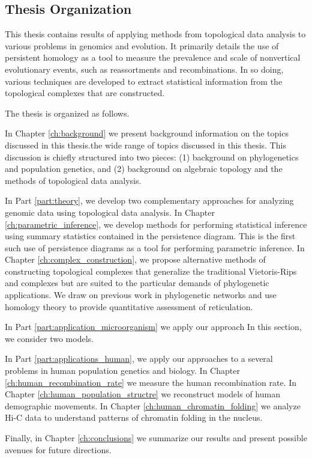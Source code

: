 \subsection{Thesis Organization}

This thesis contains results of applying methods from topological data analysis to various problems in genomics and evolution.
It primarily details the use of persistent homology as a tool to measure the prevalence and scale of nonvertical evolutionary events, such as reassortments and recombinations.
In so doing, various techniques are developed to extract statistical information from the topological complexes that are constructed.

The thesis is organized as follows.

In Chapter \ref{ch:background} we present background information on the topics discussed in this thesis.the wide range of topics discussed in this thesis.
This discussion is chiefly structured into two pieces: (1) background on phylogenetics and population genetics, and (2) background on algebraic topology and the methods of topological data analysis.

In Part \ref{part:theory}, we develop two complementary approaches for analyzing genomic data using topological data analysis.
In Chapter \ref{ch:parametric_inference}, we develop methods for performing statistical inference using summary statistics contained in the persistence diagram.
This is the first such use of persistence diagrams as a tool for performing parametric inference.
In Chapter \ref{ch:complex_construction}, we propose alternative methods of constructing topological complexes that generalize the traditional Vietoris-Rips and \Cech complexes but are suited to the particular demands of phylogenetic applications.
We draw on previous work in phylogenetic networks and use homology theory to provide quantitative assessment of reticulation.

In Part \ref{part:application_microorganism} we apply our approach 
In this section, we consider two models.

In Part \ref{part:applications_human}, we apply our approaches to a several problems in human population genetics and biology.
In Chapter \ref{ch:human_recombination_rate} we measure the human recombination rate.
In Chapter \ref{ch:human_population_structre} we reconstruct models of human demographic movements.
In Chapter \ref{ch:human_chromatin_folding} we analyze Hi-C data to understand patterns of chromatin folding in the nucleus.

Finally, in Chapter \ref{ch:conclusions} we summarize our results and present possible avenues for future directions.